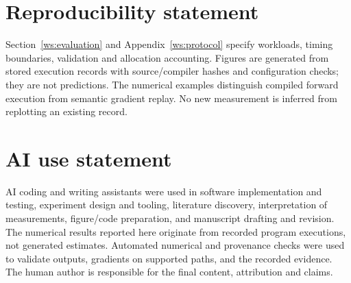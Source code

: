 \section*{Reproducibility statement}
Section~\ref{ws:evaluation} and Appendix~\ref{ws:protocol} specify workloads,
timing boundaries, validation and allocation accounting. Figures are generated
from stored execution records with source/compiler hashes and configuration
checks; they are not predictions. The numerical examples distinguish compiled
forward execution from semantic gradient replay. No new measurement is inferred
from replotting an existing record.

\section*{AI use statement}
AI coding and writing assistants were used in software implementation and
testing, experiment design and tooling, literature discovery, interpretation
of measurements, figure/code preparation, and manuscript drafting and revision.
The numerical results reported here originate from recorded program executions,
not generated estimates. Automated numerical and provenance checks were used
to validate outputs, gradients on supported paths, and the recorded evidence.
The human author is responsible for the final content, attribution and claims.

